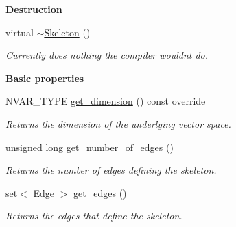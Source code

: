 \begin{Indent}\textbf{ Destruction}\par
\begin{DoxyCompactItemize}
\item 
\mbox{\label{group___c_l_s_solvers_a0da8ede73aea9089d7b81683c08cfc60}} 
virtual \hyperlink{group___c_l_s_solvers_a0da8ede73aea9089d7b81683c08cfc60}{$\sim$\+Skeleton} ()
\begin{DoxyCompactList}\small\item\em Currently does nothing the compiler wouldn\textquotesingle{}t do. \end{DoxyCompactList}\end{DoxyCompactItemize}
\end{Indent}
\begin{Indent}\textbf{ Basic properties}\par
\begin{DoxyCompactItemize}
\item 
\mbox{\label{group___c_l_s_solvers_a97df76042269bc785c37f2315c353ed3}} 
N\+V\+A\+R\+\_\+\+T\+Y\+PE \hyperlink{group___c_l_s_solvers_a97df76042269bc785c37f2315c353ed3}{get\+\_\+dimension} () const override
\begin{DoxyCompactList}\small\item\em Returns the dimension of the underlying vector space. \end{DoxyCompactList}\item 
\mbox{\label{group___c_l_s_solvers_a310919f8faa248ffa479004d91c4defa}} 
unsigned long \hyperlink{group___c_l_s_solvers_a310919f8faa248ffa479004d91c4defa}{get\+\_\+number\+\_\+of\+\_\+edges} ()
\begin{DoxyCompactList}\small\item\em Returns the number of edges defining the skeleton. \end{DoxyCompactList}\item 
\mbox{\label{group___c_l_s_solvers_aac51e256cb56e7fe4844c206dcfcf35b}} 
set$<$ \hyperlink{group___c_l_s_solvers_class_l_p___solvers_1_1_edge}{Edge} $>$ \hyperlink{group___c_l_s_solvers_aac51e256cb56e7fe4844c206dcfcf35b}{get\+\_\+edges} ()
\begin{DoxyCompactList}\small\item\em Returns the edges that define the skeleton. \end{DoxyCompactList}\item 

\end{DoxyCompactItemize}
\end{Indent}
